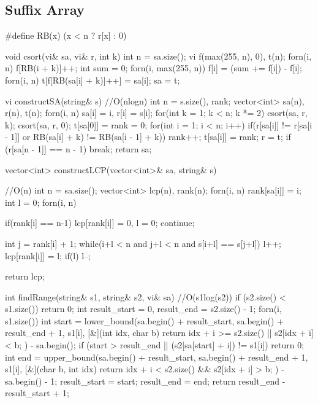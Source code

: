\documentclass[10pt, landscape, twocolumn, a4paper, notitlepage]{article}
\begin{document}
\subsection{Suffix Array}
\begin{code}
#define RB(x) (x < n ? r[x] : 0)
 
void csort(vi& sa, vi& r, int k) {
    int n = sa.size();
    vi f(max(255, n), 0), t(n);
    forn(i, n) f[RB(i + k)]++;
    int sum  = 0;
    forn(i, max(255, n)) f[i] = (sum += f[i]) - f[i];
    forn(i, n) t[f[RB(sa[i] + k)]++] = sa[i];
    sa = t;
}
 
vi constructSA(string& s) { //O(nlogn)
    int n = s.size(), rank;
    vector<int> sa(n), r(n), t(n);
    forn(i, n) sa[i] = i, r[i] = s[i];
    for(int k = 1; k < n; k *= 2) {
        csort(sa, r, k); csort(sa, r, 0);
        t[sa[0]] = rank = 0;
        for(int i = 1; i < n; i++) {
            if(r[sa[i]] != r[sa[i - 1]] or RB(sa[i] + k) != RB(sa[i - 1] + k)) rank++;
            t[sa[i]] = rank;
        }
        r = t;
        if (r[sa[n - 1]] == n - 1) break;
    }
    return sa;
}

vector<int> constructLCP(vector<int>& sa, string& s){ //O(n)
    int n = sa.size();
    vector<int> lcp(n), rank(n);
    forn(i, n) rank[sa[i]] = i;
    int l = 0;
    forn(i, n){
        if(rank[i] == n-1){
            lcp[rank[i]] = 0, l = 0;
            continue;
        }

        int j = rank[i] + 1;
        while(i+l < n and j+l < n and s[i+l] == s[j+l]) l++;
        lcp[rank[i]] = l;
        if(l) l--;
    }
    return lcp;
}
 
int findRange(string& s1, string& s2, vi& sa) { //O(s1log(s2))
    if (s2.size() < s1.size()) {
        return 0;
    }
    int result_start = 0, result_end = s2.size() - 1;
    forn(i, s1.size()) {
        int start = lower_bound(sa.begin() + result_start, sa.begin() + result_end + 1, s1[i], [&](int idx, char b) {
            return idx + i >= s2.size() || s2[idx + i] < b;
        }) - sa.begin();
        if (start > result_end || (s2[sa[start] + i]) != s1[i]) {
            return 0;
        }
        int end = upper_bound(sa.begin() + result_start, sa.begin() + result_end + 1, s1[i], [&](char b, int idx) {
            return idx + i < s2.size() && s2[idx + i] > b;
        }) - sa.begin() - 1;
        result_start = start;
        result_end = end;
    }
    return result_end - result_start + 1;
}
\end{code}
\end{document}
